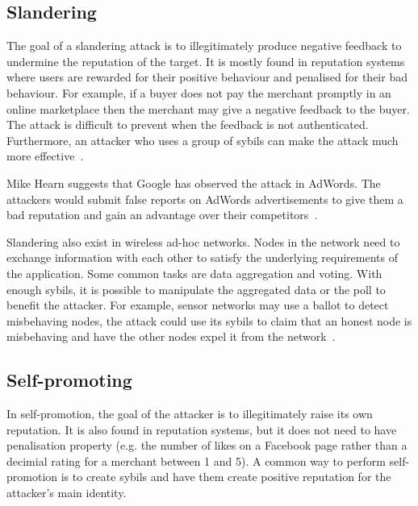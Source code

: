 \subsection{Slandering}
The goal of a slandering attack is to illegitimately produce negative feedback
to undermine the reputation of the target. It is mostly found in reputation
systems where users are rewarded for their positive behaviour and penalised for
their bad behaviour. For example, if a buyer does not pay the merchant promptly
in an online marketplace then the merchant may give a negative feedback to the
buyer. The attack is difficult to prevent when the feedback is not
authenticated. Furthermore, an attacker who uses a group of sybils can make the
attack much more effective~\cite{hoffman2009survey}.

Mike Hearn suggests that Google has observed the attack in AdWords. The
attackers would submit false reports on AdWords advertisements to give them a
bad reputation and gain an advantage over their competitors~\cite{adwords}.

Slandering also exist in wireless ad-hoc networks. Nodes in the network need to
exchange information with each other to satisfy the underlying requirements of
the application. Some common tasks are data aggregation and voting. With enough
sybils, it is possible to manipulate the aggregated data or the poll to benefit
the attacker. For example, sensor networks may use a ballot to detect
misbehaving nodes, the attack could use its sybils to claim that an honest node
is misbehaving and have the other nodes expel it from the
network~\cite{newsome2004sybil}.

\subsection{Self-promoting}
In self-promotion, the goal of the attacker is to illegitimately raise its own
reputation. It is also found in reputation systems, but it does not need to have
penalisation property (e.g. the number of likes on a Facebook page rather than a
decimial rating for a merchant between 1 and 5). A common way to perform
self-promotion is to create sybils and have them create positive reputation for
the attacker's main identity.

\begin{comment}
Dini and Spagnolo studied the economics of buying reputation on eBay. The
authors discovered many cheap items (around \euro{0.7}) for sell are simply there to
boost feedback. For example, one of the item is titled ``Apple Cranberry Crisp
Recipe + 100\% Positive Feedback''. The authors successfully boosted their
feedback by purchasing such items. But they made an unsuccessful attempted to
place a bid on their own good with a fake account~\cite{dini2009buying}.
\end{comment}

